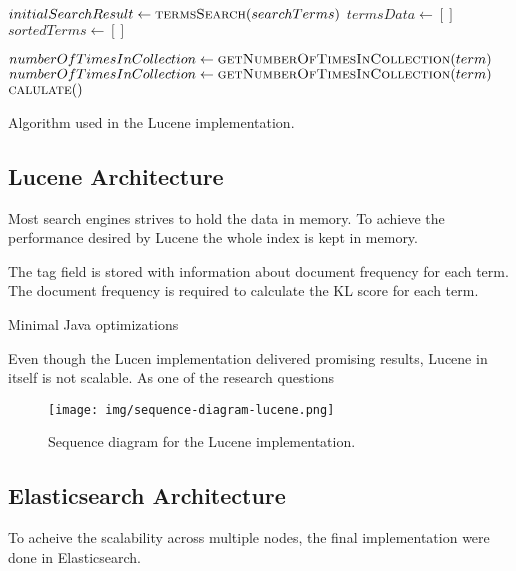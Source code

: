 \begin{algorithm}
  \begin{algorithmic}
    \State $initialSearchResult \gets \Call{termsSearch}{searchTerms}$
    \State $termsData \gets [ ]$
    \State $sortedTerms \gets [ ]$

        \State $numberOfTimesInCollection \gets \Call{getNumberOfTimesInCollection}{term}$
        \State $numberOfTimesInCollection \gets \Call{getNumberOfTimesInCollection}{term}$
        \State {}
      \EndFor
    \EndFor
      \State $\Call{calulate}$
    \EndFor

  \end{algorithmic}
  \caption{Algorithm used in the Lucene implementation.}
\end{algorithm}

\subsection{Lucene Architecture}
Most search engines strives to hold the data in memory.
To achieve the performance desired by Lucene the whole index is kept in memory.

The tag field is stored with information about document frequency for each term.
The document frequency is required to calculate the KL score for each term.

Minimal Java optimizations

Even though the Lucen implementation delivered promising results, Lucene in itself is not scalable.
As one of the research questions

\begin{figure}[h!]
\centering \texttt{[image: img/sequence-diagram-lucene.png]}
\caption{Sequence diagram for the Lucene implementation.}
\label{fig:sequence-diagram-lucene}
\end{figure}

\subsection{Elasticsearch Architecture}
To acheive the scalability across multiple nodes, the final implementation were done in Elasticsearch.


